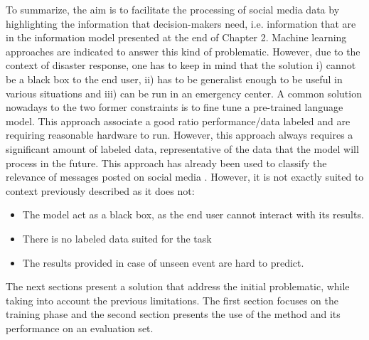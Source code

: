 To summarize, the aim is to facilitate the processing of social media data by highlighting
the information that decision-makers need, i.e. information that are in the information
model presented at the end of Chapter 2.
Machine learning approaches are indicated to answer this kind of problematic.
However, due to the context of disaster response, one has to keep in mind that the solution
i) cannot be a black box to the end user, ii) has to be generalist enough to be useful in
various situations and iii) can be run in an emergency center.
A common solution nowadays to the two former constraints is to fine tune a pre-trained
language model.
This approach associate a good ratio performance/data labeled and are requiring reasonable
hardware to run.
However, this approach always requires a significant amount of labeled data, representative
of the data that the model will process in the future.
This approach has already been used to classify the relevance of messages posted on social media \parencite{kozlowskiThreelevelClassificationFrench2020}.
However, it is not exactly suited to context previously described as it does not:

\begin{itemize}
    \item The model act as a black box, as the end user cannot interact with its results.
    \item There is no labeled data suited for the task
    \item The results provided in case of unseen event are hard to predict.
\end{itemize}

The next sections present a solution that address the initial problematic, while taking
into account the previous limitations.
The first section focuses on the training phase and the second section presents the use
of the method and its performance on an evaluation set.

